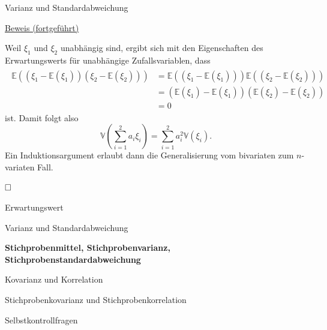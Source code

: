 \documentclass[
  8pt,
  ignorenonframetext,
]{beamer}
\begin{document}
\begin{frame}{Varianz und Standardabweichung}
\protect\hypertarget{varianz-und-standardabweichung-10}{}
\footnotesize

\underline{Beweis (fortgeführt)} \vspace{2mm}

Weil \(\xi_1\) und \(\xi_2\) unabhängig sind, ergibt sich mit den
Eigenschaften des Erwartungswerts für unabhängige Zufallsvariablen, dass
\begin{align}
\begin{split}
\mathbb{E}\left((\xi_1 - \mathbb{E}(\xi_1))(\xi_2 - \mathbb{E}(\xi_2))\right)
& = \mathbb{E}\left((\xi_1 - \mathbb{E}(\xi_1))\right)
    \mathbb{E}\left((\xi_2 - \mathbb{E}(\xi_2))\right) \\
& = (\mathbb{E}(\xi_1) - \mathbb{E}(\xi_1))
    (\mathbb{E}(\xi_2) - \mathbb{E}(\xi_2)) \\
& = 0
\end{split}
\end{align} ist. Damit folgt also \begin{equation}
\mathbb{V}\left(\sum_{i=1}^2 a_i \xi_i\right)
=  \sum_{i=1}^2 a_i^2\mathbb{V}(\xi_i).
\end{equation} Ein Induktionsargument erlaubt dann die Generalisierung
vom bivariaten zum \(n\)-variaten Fall.

\(\hfill\Box\)
\end{frame}

\begin{frame}{}
\protect\hypertarget{section-7}{}
\large
\vfill

Erwartungswert

Varianz und Standardabweichung

\normalsize

\textbf{Stichprobenmittel, Stichprobenvarianz,
Stichprobenstandardabweichung}

\large

Kovarianz und Korrelation

Stichprobenkovarianz und Stichprobenkorrelation

Selbstkontrollfragen \vfill
\end{frame}
\end{document}
